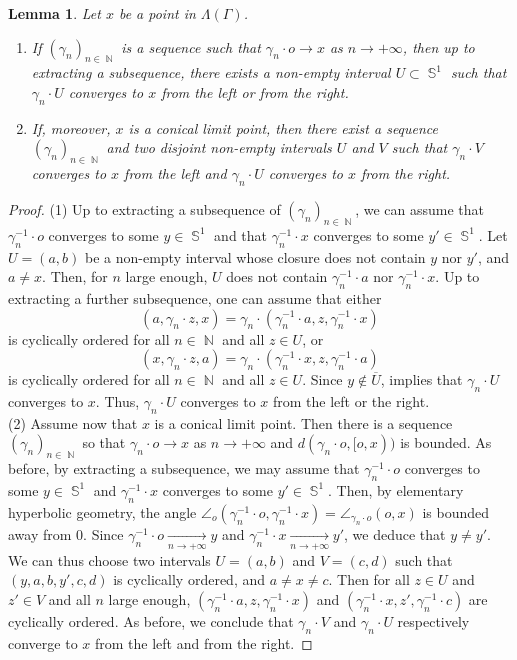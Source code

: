 \documentclass{amsart}
\theoremstyle{plain}
\newtheorem{lemma}[proposition]{Lemma}
\theoremstyle{definition}
\DeclareMathOperator{\Nb}{{\mathbb{N}}}
\DeclareMathOperator{\Sb}{\mathbb{S}}
\newcommand{\1}{\mathbf{1}}
\begin{document}
\begin{lemma} \label{lem: Monotonous limit points}
    Let $x$ be a point in $\Lambda(\Gamma)$.
    \begin{enumerate}
        \item If $(\gamma_n)_{n\in\Nb}$ is a sequence such that $\gamma_n\cdot o\to x$ as $n\to +\infty$, then up to extracting a subsequence, there exists a non-empty interval $U\subset \Sb^1$ such that $\gamma_n\cdot U$ converges to $x$ from the left or from the right.
        \item If, moreover, $x$ is a conical limit point, then there exist a sequence $(\gamma_n)_{n\in\Nb}$ and two disjoint non-empty intervals $U$ and $V$ such that $\gamma_n\cdot V$ converges to $x$ from the left and $\gamma_n\cdot U$ converges to $x$ from the right.
    \end{enumerate}
    
\end{lemma}
\begin{proof}
   (1) Up to extracting a subsequence of $(\gamma_n)_{n\in\Nb}$, we can assume that $\gamma_n^{-1}\cdot o$ converges to some $y\in \Sb^1$ and that $\gamma_n^{-1}\cdot x$ converges to some $y'\in\Sb^1$. Let $U=(a,b)$ be a non-empty interval whose closure does not contain $y$ nor $y'$, and $a\neq x$. Then, for $n$ large enough, $U$ does not contain $\gamma_n^{-1}\cdot a$ nor $\gamma_n^{-1}\cdot x$. Up to extracting a further subsequence, one can assume that either 
   \[(a,\gamma_n\cdot z,x)=\gamma_n\cdot (\gamma_n^{-1} \cdot a, z, \gamma_n^{-1}\cdot x)\]
   is cyclically ordered for all $n\in \Nb$ and all $z\in U$, or 
   \[(x,\gamma_n\cdot z,a)=\gamma_n\cdot (\gamma_n^{-1} \cdot x, z, \gamma_n^{-1}\cdot a)\]
   is cyclically ordered for all $n\in \Nb$ and all $z\in U$. Since $y\notin\overline{U}$,  implies that $\gamma_n\cdot U$ converges to $x$. Thus, $\gamma_n\cdot U$ converges to $x$ from the left or the right.\\

   \noindent (2) Assume now that $x$ is a conical limit point. Then there is a sequence $(\gamma_n)_{n\in\Nb}$ so that $\gamma_n\cdot o\to x$ as $n\to+\infty$ and  $d(\gamma_n\cdot o, [o,x))$ is bounded. As before, by extracting a subsequence, we may assume that $\gamma_n^{-1}\cdot o$ converges to some $y\in\Sb^1$ and $\gamma_n^{-1}\cdot x$ converges to some $y'\in\Sb^1$. Then, by elementary hyperbolic geometry, the angle $\angle_o(\gamma_n^{-1} \cdot o, \gamma_n^{-1}\cdot x) = \angle_{\gamma_n\cdot o}(o,x)$ is bounded away from $0$. Since $\gamma_n^{-1}\cdot o \underset{n\to +\infty}{\longrightarrow} y$ and $\gamma_n^{-1}\cdot x \underset{n\to +\infty}{\longrightarrow} y'$, we deduce that $y\neq y'$. We can thus choose two intervals $U=(a,b)$ and $V= (c,d)$ such that $(y,a,b,y',c,d)$ is cyclically ordered, and $a\neq x\neq c$. Then for all $z\in U$ and $z'\in V$ and all $n$ large enough, $(\gamma_n^{-1}\cdot a, z, \gamma_n^{-1} \cdot x)$ and $(\gamma_n^{-1}\cdot x, z', \gamma_n^{-1} \cdot c)$ are cyclically ordered. As before, we conclude that $\gamma_n\cdot V$ and $\gamma_n\cdot U$ respectively converge to $x$ from the left and from the right.
   \end{proof}
\end{document}
